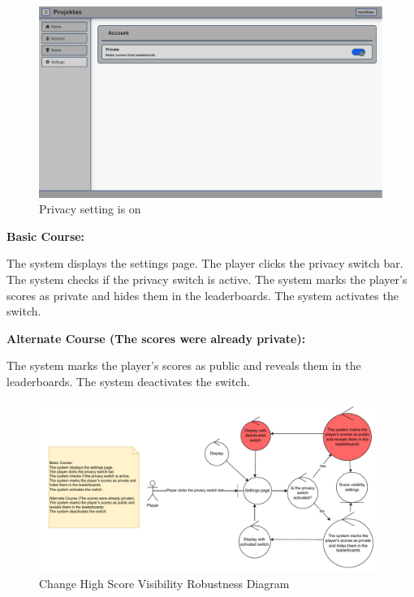 \documentclass[11pt,a4paper]{article}
\newcommand{\heading}[1]{\vspace{1em}\noindent\textbf{#1}\par\vspace{0.5em}}
\begin{document}
\begin{figure}[H]
    \centering
    \includegraphics[width=1\textwidth,keepaspectratio]{PSI_3rd_trial/PNGs/privacy_settings_on.png}
    \caption{Privacy setting is on}
    \label{fig:privacy_settings_on}
\end{figure}


\heading{Basic Course:}
The system displays the settings page. The player clicks the privacy switch bar. The system checks if the privacy switch is active. The system marks the player’s scores as private and hides them in the leaderboards. The system activates the switch.

\heading{Alternate Course (The scores were already private):}
The system marks the player’s scores as public and reveals them in the leaderboards. The system deactivates the switch.

\begin{figure}[H]
    \centering
    \includegraphics[width=1\textwidth,keepaspectratio]{PSI_3rd_trial/robustness/score_privacy.drawio.pdf}
    \caption{Change High Score Visibility Robustness Diagram}
    \label{fig:high_score_visibility_diagram}
\end{figure}
\end{document}
